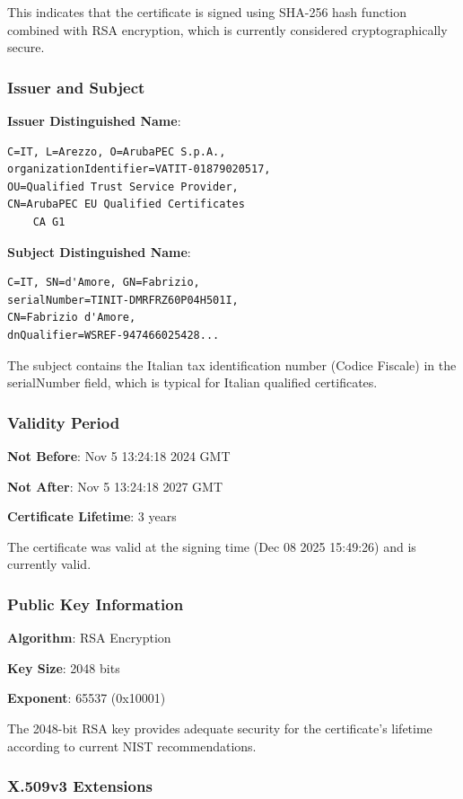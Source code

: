 \documentclass[12pt,a4paper]{article}
\begin{document}
This indicates that the certificate is signed using SHA-256 hash function combined with RSA encryption, which is currently considered cryptographically secure.

\subsubsection{Issuer and Subject}

\textbf{Issuer Distinguished Name}:
\begin{verbatim}
C=IT, L=Arezzo, O=ArubaPEC S.p.A.,
organizationIdentifier=VATIT-01879020517,
OU=Qualified Trust Service Provider,
CN=ArubaPEC EU Qualified Certificates
    CA G1
\end{verbatim}

\textbf{Subject Distinguished Name}:
\begin{verbatim}
C=IT, SN=d'Amore, GN=Fabrizio,
serialNumber=TINIT-DMRFRZ60P04H501I,
CN=Fabrizio d'Amore,
dnQualifier=WSREF-947466025428...
\end{verbatim}

The subject contains the Italian tax identification number (Codice Fiscale) in the serialNumber field, which is typical for Italian qualified certificates.

\subsubsection{Validity Period}

\textbf{Not Before}: Nov 5 13:24:18 2024 GMT

\textbf{Not After}: Nov 5 13:24:18 2027 GMT

\textbf{Certificate Lifetime}: 3 years

The certificate was valid at the signing time (Dec 08 2025 15:49:26) and is currently valid.

\subsubsection{Public Key Information}

\textbf{Algorithm}: RSA Encryption

\textbf{Key Size}: 2048 bits

\textbf{Exponent}: 65537 (0x10001)

The 2048-bit RSA key provides adequate security for the certificate's lifetime according to current NIST recommendations.

\subsubsection{X.509v3 Extensions}
\end{document}

